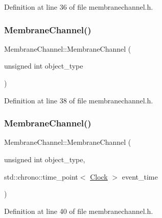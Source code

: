 Definition at line 36 of file membranechannel.\+h.

\mbox{\label{class_membrane_channel_a17cdd2064bebb7bd2568cf5ec92715fc}} 
\subsubsection{\texorpdfstring{Membrane\+Channel()}{MembraneChannel()}\hspace{0.1cm}{\footnotesize\ttfamily [2/4]}}
{\footnotesize\ttfamily Membrane\+Channel\+::\+Membrane\+Channel (\begin{DoxyParamCaption}\item[{unsigned int}]{object\+\_\+type }\end{DoxyParamCaption})\hspace{0.3cm}{\ttfamily [inline]}}



Definition at line 38 of file membranechannel.\+h.

\mbox{\label{class_membrane_channel_aedc9eb52da9e7160850f552781df27b6}} 
\subsubsection{\texorpdfstring{Membrane\+Channel()}{MembraneChannel()}\hspace{0.1cm}{\footnotesize\ttfamily [3/4]}}
{\footnotesize\ttfamily Membrane\+Channel\+::\+Membrane\+Channel (\begin{DoxyParamCaption}\item[{unsigned int}]{object\+\_\+type,  }\item[{std\+::chrono\+::time\+\_\+point$<$ \mbox{\hyperlink{universe_8h_a0ef8d951d1ca5ab3cfaf7ab4c7a6fd80}{Clock}} $>$}]{event\+\_\+time }\end{DoxyParamCaption})\hspace{0.3cm}{\ttfamily [inline]}}



Definition at line 40 of file membranechannel.\+h.

\mbox{\label{class_membrane_channel_ac467743cbdebcdc6a77ad5ea0527e6f0}} 
